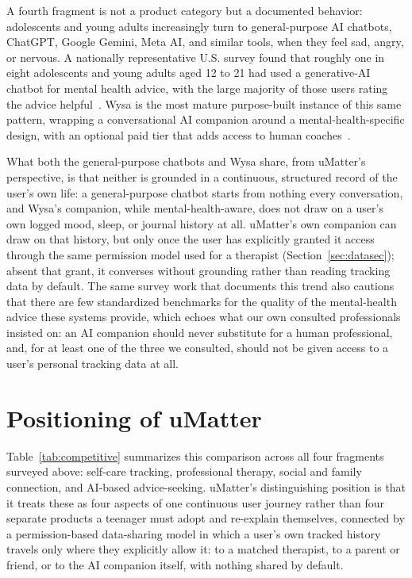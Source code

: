 A fourth fragment is not a product category but a documented behavior: adolescents and young adults increasingly turn to general-purpose AI chatbots, ChatGPT, Google Gemini, Meta AI, and similar tools, when they feel sad, angry, or nervous. A nationally representative U.S. survey found that roughly one in eight adolescents and young adults aged 12 to 21 had used a generative-AI chatbot for mental health advice, with the large majority of those users rating the advice helpful~\cite{2025-McBain-GenAI}. Wysa is the most mature purpose-built instance of this same pattern, wrapping a conversational AI companion around a mental-health-specific design, with an optional paid tier that adds access to human coaches~\cite{Wysa}.

What both the general-purpose chatbots and Wysa share, from uMatter's perspective, is that neither is grounded in a continuous, structured record of the user's own life: a general-purpose chatbot starts from nothing every conversation, and Wysa's companion, while mental-health-aware, does not draw on a user's own logged mood, sleep, or journal history at all. uMatter's own companion can draw on that history, but only once the user has explicitly granted it access through the same permission model used for a therapist (Section~\ref{sec:datasec}); absent that grant, it converses without grounding rather than reading tracking data by default. The same survey work that documents this trend also cautions that there are few standardized benchmarks for the quality of the mental-health advice these systems provide, which echoes what our own consulted professionals insisted on: an AI companion should never substitute for a human professional, and, for at least one of the three we consulted, should not be given access to a user's personal tracking data at all.

\section{Positioning of uMatter}

Table~\ref{tab:competitive} summarizes this comparison across all four fragments surveyed above: self-care tracking, professional therapy, social and family connection, and AI-based advice-seeking. uMatter's distinguishing position is that it treats these as four aspects of one continuous user journey rather than four separate products a teenager must adopt and re-explain themselves, connected by a permission-based data-sharing model in which a user's own tracked history travels only where they explicitly allow it: to a matched therapist, to a parent or friend, or to the AI companion itself, with nothing shared by default.

